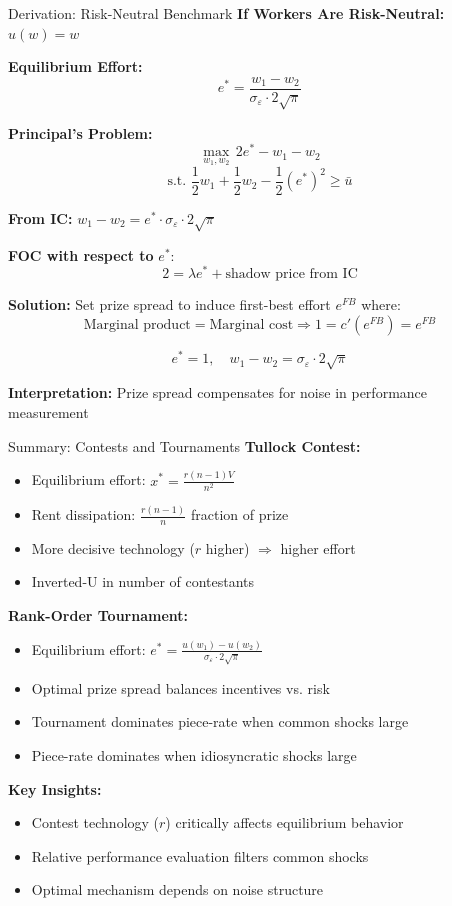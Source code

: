 \documentclass[xcolor={x11names}]{beamer}
\begin{document}
\begin{frame}{Derivation: Risk-Neutral Benchmark}
\textbf{If Workers Are Risk-Neutral:} $u(w) = w$

\textbf{Equilibrium Effort:}
$$e^* = \frac{w_1 - w_2}{\sigma_\varepsilon \cdot 2\sqrt{\pi}}$$

\textbf{Principal's Problem:}
$$\max_{w_1, w_2} \, 2e^* - w_1 - w_2$$
$$\text{s.t. } \frac{1}{2}w_1 + \frac{1}{2}w_2 - \frac{1}{2}(e^*)^2 \geq \bar{u}$$

\textbf{From IC:} $w_1 - w_2 = e^* \cdot \sigma_\varepsilon \cdot 2\sqrt{\pi}$

\textbf{FOC with respect to} $e^*$:
$$2 = \lambda e^* + \text{shadow price from IC}$$

\textbf{Solution:} Set prize spread to induce first-best effort $e^{FB}$ where:
$$\text{Marginal product} = \text{Marginal cost} \Rightarrow 1 = c'(e^{FB}) = e^{FB}$$

$$\boxed{e^* = 1, \quad w_1 - w_2 = \sigma_\varepsilon \cdot 2\sqrt{\pi}}$$

\textbf{Interpretation:} Prize spread compensates for noise in performance measurement
\end{frame}
\begin{frame}{Summary: Contests and Tournaments}
\textbf{Tullock Contest:}
\begin{itemize}
  \item Equilibrium effort: $x^* = \frac{r(n-1)V}{n^2}$
  \item Rent dissipation: $\frac{r(n-1)}{n}$ fraction of prize
  \item More decisive technology ($r$ higher) $\Rightarrow$ higher effort
  \item Inverted-U in number of contestants
\end{itemize}


\textbf{Rank-Order Tournament:}
\begin{itemize}
  \item Equilibrium effort: $e^* = \frac{u(w_1) - u(w_2)}{\sigma_\varepsilon \cdot 2\sqrt{\pi}}$
  \item Optimal prize spread balances incentives vs. risk
  \item Tournament dominates piece-rate when common shocks large
  \item Piece-rate dominates when idiosyncratic shocks large
\end{itemize}


\textbf{Key Insights:}
\begin{itemize}
  \item Contest technology ($r$) critically affects equilibrium behavior
  \item Relative performance evaluation filters common shocks
  \item Optimal mechanism depends on noise structure
\end{itemize}
\end{frame}
\end{document}
